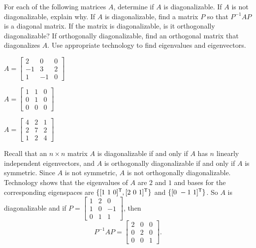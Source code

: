 \label{sec:orthog_diag_exam}

\ExampleIntro

\begin{example} For each of the following matrices $A$, determine if $A$ is diagonalizable. If $A$ is not diagonalizable, explain why. If $A$ is diagonalizable, find a matrix $P$ so that $P^{-1}AP$ is a diagonal matrix. If the matrix is diagonalizable, is it orthogonally diagonalizable? If orthogonally diagonalizable, find an orthogonal matrix that diagonalizes $A$. Use appropriate technology to find eigenvalues and eigenvectors. 
	\ba
	\begin{minipage}{1.75in}
	\item $A = \left[ \begin{array}{rrc}  2  &  0  &  0 \\  -1  &  3  &  2 \\  1  & -1  &  0  \end{array} \right]$
	\end{minipage}
	\begin{minipage}{1.5in}
	\item $A = \left[ \begin{array}{ccc}   1  &  1  &  0 \\  0  &  1  &  0 \\  0  &  0  &  0 \end{array} \right]$
	\end{minipage}
	\begin{minipage}{1.5in}
	\item $A = \left[ \begin{array}{ccc}   4  &  2  &  1 \\  2  &  7  &  2 \\  1  &  2  &  4 \end{array} \right]$
	\end{minipage}

	\ea


\ExampleSolution

	\ba
	\item  Recall that an $n \times n$ matrix $A$ is diagonalizable if and only if $A$ has $n$ linearly independent eigenvectors, and $A$ is orthogonally diagonalizable if and only if $A$ is symmetric. Since $A$ is not symmetric, $A$ is not orthogonally diagonalizable. Technology shows that the eigenvalues of $A$ are $2$ and $1$ and bases for the corresponding eigenspaces are  $\{ [1 \ 1\ 0]^{\mathsf{T}}, [2 \ 0 \ 1]^{\mathsf{T}} \}$ and $\{[0 \ -1 \ 1]^{\mathsf{T}}\}$. So $A$ is diagonalizable and if $P = \left[ \begin{array}{rcr} 1&2&0\\1&0&-1\\0&1&1 \end{array} \right]$, then 
\[P^{-1}AP = \left[ \begin{array}{ccc} 2&0&0\\0&2&0\\0&0&1 \end{array} \right].\]


\end{example}
